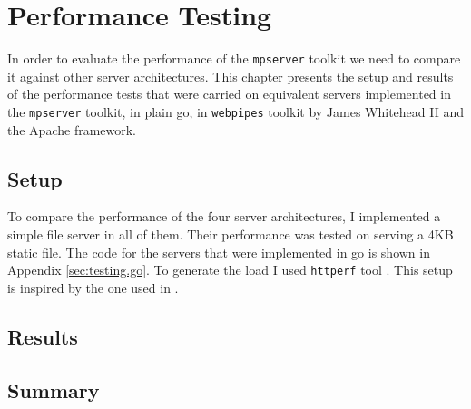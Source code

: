 \section{Performance Testing}
\label{sec:test}
In order to evaluate the performance of the \texttt{mpserver} toolkit we 
need to compare it against other server architectures.
This chapter presents the setup and results of the performance tests
that were carried on equivalent servers implemented in the \texttt{mpserver} toolkit,
in plain go, in \texttt{webpipes} toolkit by James Whitehead II 
\cite{whitehead} and the Apache framework.

\subsection{Setup}
To compare the performance of the four server architectures, I 
implemented a simple file server in all of them. Their performance 
was tested on serving a 4KB static file. The code for the servers 
that were implemented in go is shown in Appendix \ref{sec:testing.go}. To generate 
the load I used \texttt{httperf} tool \cite{httperf}. This setup
is inspired by the one used in \cite{whitehead}.


\subsection{Results}

\subsection{Summary}

